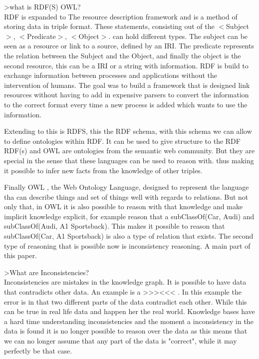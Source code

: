 \documentclass{article}
\begin{document}
>what is RDF(S) OWL?\\
RDF \cite{rdfPrimer:2014} is expanded to The resource description framework and is a method of storing data in triple format. These statements, consisting out of the $<$Subject$>$, $<$Predicate$>$, $<$Object$>$. can hold different types. The subject can be seen as a resource or link to a source, defined by an IRI. 
The predicate represents the relation between the Subject and the Object, and finally the object is the second resource, this can be a IRI or a string with information.
RDF is build to exchange information between processes and applications without the intervention of humans. The goal was to build a framework that is designed link resources without having to add in expensive parsers to convert the information to the correct format every time a new process is added which wants to use the information.

Extending to this is RDFS, this the RDF schema, with this schema we can allow to define ontologies within RDF. It can be used to give structure to the RDF
RDF(s) and OWL are ontologies from the semantic web community. But they are special in the sense that these languages can be used to reason with. thus making it possible to infer new facts from the knowledge of other triples.

Finally OWL \cite{OWLPrimer:2012}, the Web Ontology Language, designed to represent the language tha can describe things and set of things well with regards to relations. But not only that, in OWL it is also possible to reason with that knowledge and make implicit knowledge explicit, for example reason that a subClassOf(Car, Audi) and subClassOf(Audi, A1 Sportsback). This makes it possible to reason that subClassOf(Car, A1 Sportsback) is also a type of relation that exists. The second type of reasoning that is possible now is inconsistency reasoning. A main part of this paper.

>What are Inconsistencies?\\
Inconsistencies are mistakes in the knowledge graph. It is possible to have data that contradicts other data. An example is a >>><<< . In this example the error is in that two different parts of the data contradict each other. While this can be true in real life data and happen her the real world. Knowledge bases have a hard time understanding inconsistencies and the moment a inconsistency in the data is found it is no longer possible to reason over the data as this means that we can no longer assume that any part of the data is "correct", while it may perfectly be that case.
\end{document}

